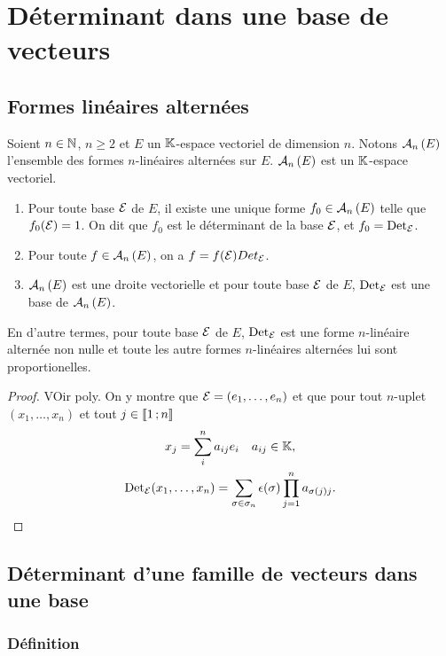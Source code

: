 \section{Déterminant dans une base de vecteurs}

\subsection{Formes linéaires alternées}

Soient $n\in \mathbb{N}$, $n\geqslant 2$ et $E$ un $\mathbb{K}$-espace vectoriel de dimension $n$. Notons $\mathcal{A}_{n}\left(E\right)$ l'ensemble des formes $n$-linéaires alternées sur $E$. $\mathcal{A}_{n}\left(E\right)$ est un $\mathbb{K}$-espace vectoriel.

\begin{theo}
\label{theo:detbases}
  \begin{enumerate}
  \item Pour toute base $\mathcal{E}$ de $E$, il existe une unique forme $f_0 \in \mathcal{A}_{n}\left(E\right)$ telle que $f_0(\mathcal{E})=1$. On dit que $f_0$ est le déterminant de la base $\mathcal{E}$, et $f_0=\operatorname{Det}_{\mathcal{E}}$.
  \item Pour toute $f \in \mathcal{A}_{n}\left(E\right)$, on a $f=f(\mathcal{E}) Det_{\mathcal{E}}$.
  \item $\mathcal{A}_{n}\left(E\right)$ est une droite vectorielle et pour toute base $\mathcal{E}$ de $E$, $\operatorname{Det}_{\mathcal{E}}$ est une base de $\mathcal{A}_{n}\left(E\right)$.
  \end{enumerate}
\end{theo}

En d'autre termes, pour toute base $\mathcal{E}$ de $E$, $\operatorname{Det}_{\mathcal{E}}$ est une forme $n$-linéaire alternée non nulle et toute les autre formes $n$-linéaires alternées lui sont proportionelles.

\begin{proof}
  VOir poly. On y montre que $\mathcal{E}=(e_1, \ldots, e_n)$ et que pour tout $n$-uplet $(x_1, \ldots, x_n)$ et tout $j \in \mathopen{\llbracket}1\mathclose{}\mathpunct{};n\mathclose{\rrbracket}$
  \begin{gather}
    x_j=\sum_{i}^n a_{ij}e_i \quad a_{ij} \in \mathbb{K}, \\
    \operatorname{Det}_{\mathcal{E}}(x_1, \ldots, x_n) =\sum_{\sigma \in \sigma_n}\epsilon(\sigma) \prod_{j=1}^n a_{\sigma(j)j}.
  \end{gather}
\end{proof}

\subsection{Déterminant d'une famille de vecteurs dans une base}

\subsubsection{Définition}

